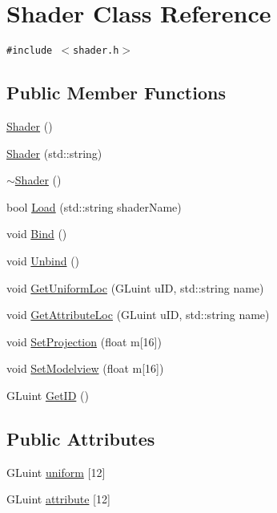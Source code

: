 \hypertarget{class_shader}{
\section{Shader Class Reference}
\label{class_shader}
}
{\tt \#include $<$shader.h$>$}

\subsection*{Public Member Functions}
\begin{CompactItemize}
\item 
\hyperlink{class_shader_0d654ebaca4e0555197c0724c6d30610}{Shader} ()
\item 
\hyperlink{class_shader_518d41ef6354061360c42a250f1bbc09}{Shader} (std::string)
\item 
\hyperlink{class_shader_ff01df87e8a102f270b5b135a295e59d}{$\sim$Shader} ()
\item 
bool \hyperlink{class_shader_4a6a8eb7a7ed9dedc46c2abbafb25785}{Load} (std::string shaderName)
\item 
void \hyperlink{class_shader_8b5c8c4788d011a65d158ef8428d1ece}{Bind} ()
\item 
void \hyperlink{class_shader_a53965ba78cf36b664e1f53d337b1b0b}{Unbind} ()
\item 
void \hyperlink{class_shader_145c8bf4d63ca088c78607b692b5d318}{GetUniformLoc} (GLuint uID, std::string name)
\item 
void \hyperlink{class_shader_90e9b005fad30ca71a1125bcb9bf74f5}{GetAttributeLoc} (GLuint uID, std::string name)
\item 
void \hyperlink{class_shader_212a29a2b803b55a80faf0d55352ba2c}{SetProjection} (float m\mbox{[}16\mbox{]})
\item 
void \hyperlink{class_shader_f49e77ad3653d4787ef754e3e495c41b}{SetModelview} (float m\mbox{[}16\mbox{]})
\item 
GLuint \hyperlink{class_shader_c77c9f2dc144eeb40c6c07182d69c308}{GetID} ()
\end{CompactItemize}
\subsection*{Public Attributes}
\begin{CompactItemize}
\item 
GLuint \hyperlink{class_shader_2aef3970f9638e967846799ba82469a7}{uniform} \mbox{[}12\mbox{]}
\item 
GLuint \hyperlink{class_shader_f0fcdb46ec6b628a3d29412c33a8b18c}{attribute} \mbox{[}12\mbox{]}
\end{CompactItemize}


